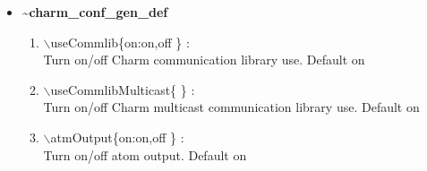 \begin{itemize}
\clearpage
\huge
\item []{\bf \~{ }charm\_conf\_gen\_def}
\begin{enumerate}
  \vspace{0.15in} \Large
  \item  $\backslash$useCommlib\{on:on,off \} : \\   \large
  Turn on/off Charm communication library use. Default on
  \vspace{0.15in} \Large
  \item  $\backslash$useCommlibMulticast\{ \} : \\   \large
  \vspace{0.15in} \Large
  Turn on/off Charm multicast communication library use. Default on
  \item  $\backslash$atmOutput\{on:on,off \} : \\   \large
  Turn on/off atom output. Default on
\end{enumerate}


\end{itemize}
